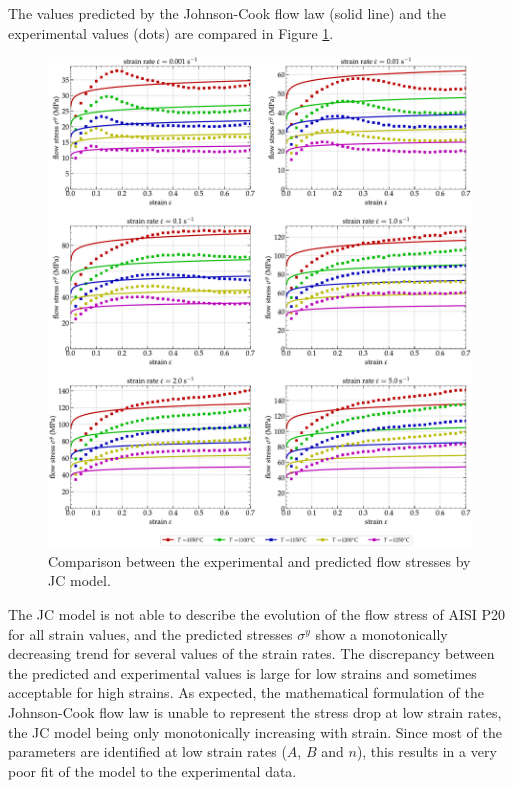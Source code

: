 \documentclass[twoside,english,1p,final,sort&compress]{elsarticle}
\theoremstyle{plain}
\begin{document}
The values predicted by the Johnson-Cook flow law (solid line) and the experimental values (dots) are compared in Figure \ref{fig:CompExp-JC-6}.
\begin{figure}[!ht]
\centering
\includegraphics[width=\columnwidth]{Figures/CompExp-JC-6}
\caption{Comparison between the experimental and predicted flow stresses by JC model.}
\label{fig:CompExp-JC-6}
\end{figure}
The JC model is not able to describe the evolution of the flow stress of AISI P20 for all strain values, and the predicted stresses $\sigma^y$ show a monotonically decreasing trend for several values of the strain rates.
The discrepancy between the predicted and experimental values is large for low strains and sometimes acceptable for high strains.
As expected, the mathematical formulation of the Johnson-Cook flow law is unable to represent the stress drop at low strain rates, the JC model being only monotonically increasing with strain.
Since most of the parameters are identified at low strain rates ($A$, $B$ and $n$), this results in a very poor fit of the model to the experimental data.
\end{document}

